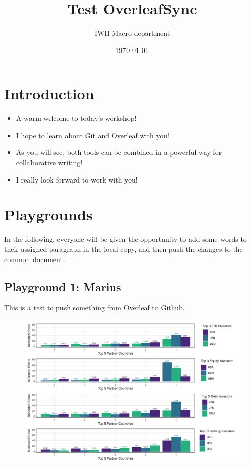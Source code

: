 \documentclass{article}
\title{Test OverleafSync}
\author{IWH Macro department}
\date{\today}
\begin{document}
\maketitle

\section{Introduction}

\begin{itemize} 
    \item A warm welcome to today's workshop!
    \item I hope to learn about Git and Overleaf with you!
    \item As you will see, both tools can be combined in a powerful way for collaborative writing!
    \item I really look forward to work with you!
\end{itemize}

\section{Playgrounds}
In the following, everyone will be given the opportunity to add some words to their assigned paragraph in the local copy, and then push the changes to the common document.

\subsection{Playground 1: Marius}
This is a test to push something from Overleaf to Github.

\begin{figure}[H]
	\includegraphics[width=1.1\textwidth]{Figures/fig_top3top5_bar_share_2019.pdf} 
\end{figure} 
\end{document}
